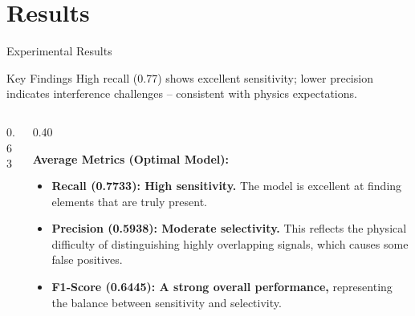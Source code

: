 \documentclass{beamer}
\begin{document}
\section{Results}
\begin{frame}{Experimental Results}
  \begin{block}{Key Findings}
    High recall (0.77) shows excellent sensitivity; lower precision indicates interference challenges -- consistent with physics expectations.
  \end{block}
  \vspace{0.1em}

  \begin{columns}[T,onlytextwidth]
    \begin{column}{0.63\textwidth}
    \end{column}
    \begin{column}{0.40\textwidth}
      {\scriptsize
        \textbf{Average Metrics (Optimal Model):}
      \begin{itemize}\setlength{\itemsep}{2pt}\setlength{\parskip}{0pt}
        \item \textbf{Recall (0.7733): High sensitivity.} The model is excellent at finding elements that are truly present.
        \item \textbf{Precision (0.5938): Moderate selectivity. }This reflects the physical difficulty of distinguishing highly overlapping signals, which causes some false positives.
        \item \textbf{F1-Score (0.6445): A strong overall performance,} representing the balance between sensitivity and selectivity.
      \end{itemize}
      }
    \end{column}
  \end{columns}
\end{frame}
\end{document}
